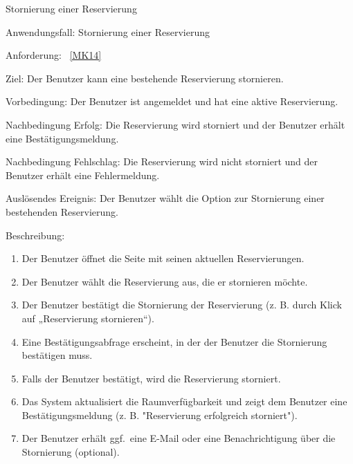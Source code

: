 \begin{function}{80}{Stornierung einer Reservierung}
    \item[Anwendungsfall:] Stornierung einer Reservierung
    \item[Anforderung:] ~\ref{MK14}
    \item[Ziel:] Der Benutzer kann eine bestehende Reservierung stornieren.
    \item[Vorbedingung:] Der Benutzer ist angemeldet und hat eine aktive Reservierung.
    \item[Nachbedingung Erfolg:] Die Reservierung wird storniert und der Benutzer erhält eine Bestätigungsmeldung.
    \item[Nachbedingung Fehlschlag:] Die Reservierung wird nicht storniert und der Benutzer erhält eine Fehlermeldung.
    \item[Auslösendes Ereignis:] Der Benutzer wählt die Option zur Stornierung einer bestehenden Reservierung.
    \item[Beschreibung:] ~
    \begin{enumerate}
        \item Der Benutzer öffnet die Seite mit seinen aktuellen Reservierungen.
        \item Der Benutzer wählt die Reservierung aus, die er stornieren möchte.
        \item Der Benutzer bestätigt die Stornierung der Reservierung (z. B. durch Klick auf „Reservierung stornieren“).
        \item Eine Bestätigungsabfrage erscheint, in der der Benutzer die Stornierung bestätigen muss.
        \item Falls der Benutzer bestätigt, wird die Reservierung storniert.
        \item Das System aktualisiert die Raumverfügbarkeit und zeigt dem Benutzer eine Bestätigungsmeldung (z. B. "Reservierung erfolgreich storniert").
        \item Der Benutzer erhält ggf.\ eine E-Mail oder eine Benachrichtigung über die Stornierung (optional).
    \end{enumerate}
\end{function}

